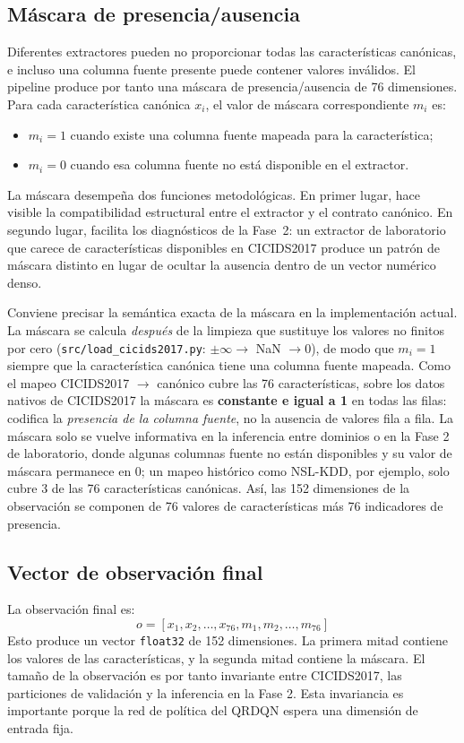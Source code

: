 \subsection{Máscara de presencia/ausencia}
Diferentes extractores pueden no proporcionar todas las características canónicas, e incluso una columna fuente presente puede contener valores inválidos. El pipeline produce por tanto una máscara de presencia/ausencia de 76 dimensiones. Para cada característica canónica $x_i$, el valor de máscara correspondiente $m_i$ es:
\begin{itemize}
    \item $m_i = 1$ cuando existe una columna fuente mapeada para la característica;
    \item $m_i = 0$ cuando esa columna fuente no está disponible en el extractor.
\end{itemize}

La máscara desempeña dos funciones metodológicas. En primer lugar, hace visible la compatibilidad estructural entre el extractor y el contrato canónico. En segundo lugar, facilita los diagnósticos de la Fase~2: un extractor de laboratorio que carece de características disponibles en CICIDS2017 produce un patrón de máscara distinto en lugar de ocultar la ausencia dentro de un vector numérico denso.

Conviene precisar la semántica exacta de la máscara en la implementación actual. La máscara se calcula \emph{después} de la limpieza que sustituye los valores no finitos por cero (\texttt{src/load\_cicids2017.py}: $\pm\infty \to$ NaN $\to 0$), de modo que $m_i = 1$ siempre que la característica canónica tiene una columna fuente mapeada. Como el mapeo CICIDS2017 $\to$ canónico cubre las 76 características, sobre los datos nativos de CICIDS2017 la máscara es \textbf{constante e igual a 1} en todas las filas: codifica la \emph{presencia de la columna fuente}, no la ausencia de valores fila a fila. La máscara solo se vuelve informativa en la inferencia entre dominios o en la Fase 2 de laboratorio, donde algunas columnas fuente no están disponibles y su valor de máscara permanece en 0; un mapeo histórico como NSL-KDD, por ejemplo, solo cubre 3 de las 76 características canónicas. Así, las 152 dimensiones de la observación se componen de 76 valores de características más 76 indicadores de presencia.

\subsection{Vector de observación final}
La observación final es:
\[
    o = [x_1, x_2, \dots, x_{76}, m_1, m_2, \dots, m_{76}]
\]
Esto produce un vector \texttt{float32} de 152 dimensiones. La primera mitad contiene los valores de las características, y la segunda mitad contiene la máscara. El tamaño de la observación es por tanto invariante entre CICIDS2017, las particiones de validación y la inferencia en la Fase 2. Esta invariancia es importante porque la red de política del QRDQN espera una dimensión de entrada fija.


